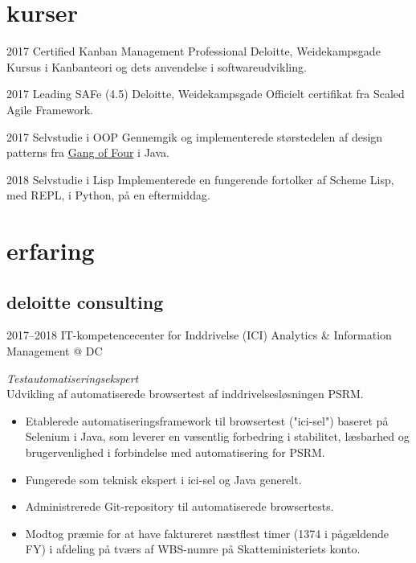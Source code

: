 \documentclass[]{../friggeri-cv} %
\begin{document}
\section{kurser}
\begin{entrylist}


\entry
{2017}
{Certified Kanban Management Professional}
{Deloitte, Weidekampsgade}
{Kursus i Kanbanteori og dets anvendelse i softwareudvikling.}

\entry
{2017}
{Leading SAFe (4.5)}
{Deloitte, Weidekampsgade}
{Officielt certifikat fra Scaled Agile Framework.}

\entry
{2017}
{Selvstudie {\normalfont i OOP}}
{}
{Gennemgik og implementerede størstedelen af design patterns fra \href{https://books.google.dk/books?id=6oHuKQe3TjQC}{Gang of Four} i Java.}


\entry
{2018}
{Selvstudie {\normalfont i Lisp}}
{}
{Implementerede en fungerende fortolker af Scheme Lisp, med REPL, i Python, på en eftermiddag.}

\end{entrylist}


\section{erfaring}

\subsection{deloitte consulting}

\begin{entrylist}
\entry
{2017--2018}
{IT-kompetencecenter for Inddrivelse (ICI)}
{Analytics \& Information Management @ DC}
{\emph{Testautomatiseringsekspert}\\
Udvikling af automatiserede browsertest af inddrivelsesløsningen PSRM. 
\begin{itemize}
\item Etablerede automatiseringsframework til browsertest ("ici-sel") baseret på Selenium i Java, som leverer en væsentlig forbedring i stabilitet, læsbarhed og brugervenlighed i forbindelse med automatisering for PSRM. 
\item Fungerede som teknisk ekspert i ici-sel og Java generelt. 
\item Administrerede Git-repository til automatiserede browsertests. 
\item Modtog præmie for at have faktureret næstflest timer (1374 i pågældende FY) i afdeling på tværs af WBS-numre på Skatteministeriets konto.
\end{itemize}
}

\end{entrylist}
\end{document}

